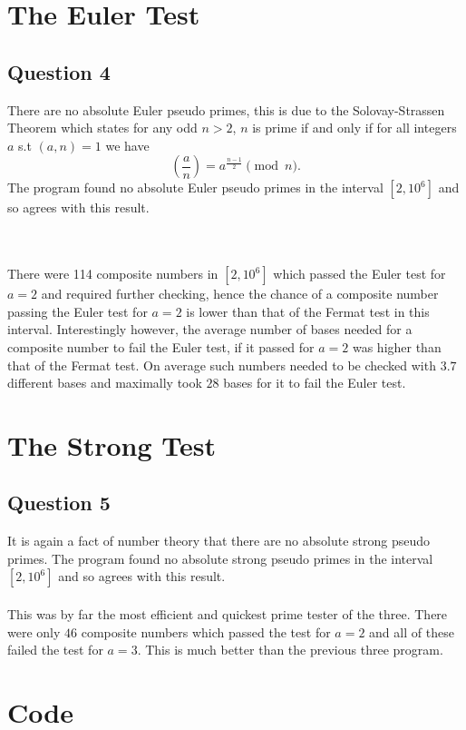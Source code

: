 \documentclass{article}
\begin{document}
\section{The Euler Test}
\subsection{Question 4}
There are no absolute Euler pseudo primes, this is due to the Solovay-Strassen Theorem which states for any odd $n>2$, $n$ is prime if and only if for all integers $a$ s.t $(a,n)=1$ we have
\[ \left(\frac{a}{n}\right)=a^{\frac{n-1}2}\pmod n.  \]
The program found no absolute Euler pseudo primes in the interval $[2,10^6]$ and so agrees with this result.\\\\\

There were 114 composite numbers in $[2,10^6]$ which passed the Euler test for $a=2$ and required further checking,  hence the chance of a composite number passing the Euler test for $a=2$ is lower than that of the Fermat test in this interval.  Interestingly however, the average number of bases needed for a composite number to fail the Euler test, if it passed for $a=2$ was higher than that of the Fermat test. On average such numbers needed to be checked with $3.7$ different bases and maximally took $28$ bases for it to fail the Euler test.
\section{The Strong Test}
\subsection{Question 5}
It is again a fact of number theory that there are no absolute strong pseudo primes.  The program found no absolute strong pseudo primes in the interval $[2,10^6]$ and so agrees with this result.\\\\

This was by far the most efficient and quickest prime tester of the three.  There were only $46$ composite numbers which passed the test for $a=2$ and all of these failed the test for $a=3$.  This is much better than the previous three program.





\section{Code}
\end{document}
